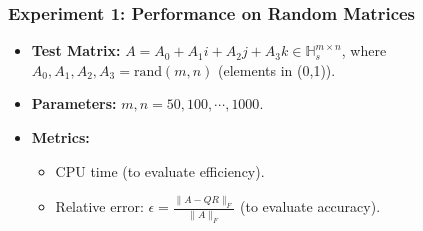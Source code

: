 \documentclass{beamer}
\begin{document}
\begin{frame}
    \frametitle{Experiment 1: Performance on Random Matrices}
    \begin{itemize}
        \item \textbf{Test Matrix:} \( A = A_0 + A_1i + A_2j + A_3k \in \mathbb{H}_s^{m \times n} \), where \( A_0,A_1,A_2,A_3 = \text{rand}(m,n) \) (elements in (0,1)).
        \item \textbf{Parameters:} \( m,n = 50,100,\cdots,1000 \).
        \item \textbf{Metrics:} 
        \begin{itemize}
            \item CPU time (to evaluate efficiency).
            \item Relative error: \( \epsilon = \frac{\|A - QR\|_F}{\|A\|_F} \) (to evaluate accuracy).
        \end{itemize}
    \end{itemize}
\end{frame}
\end{document}
